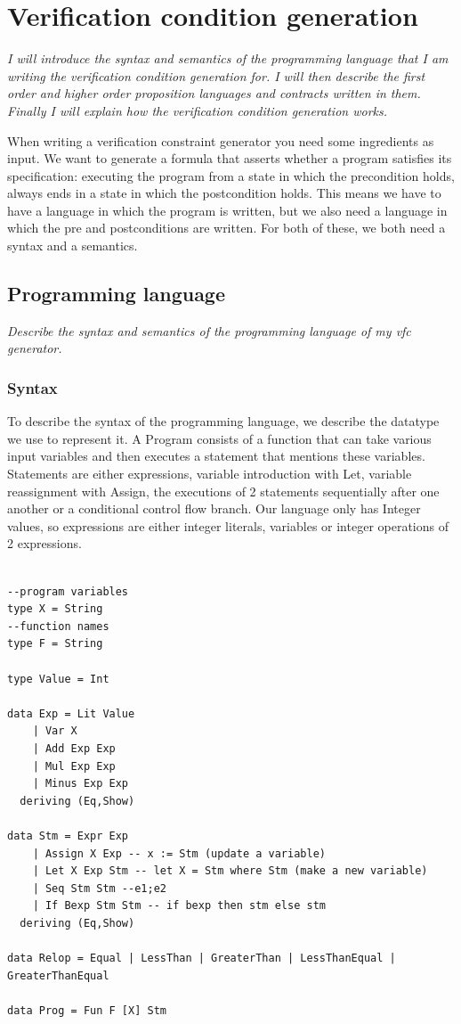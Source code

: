 \chapter{Verification condition generation}
\label{cha:2}
\textit{I will introduce the syntax and semantics of the programming language that I am writing the verification condition generation for. I will then describe the first order and higher order proposition languages and contracts written in them. Finally I will explain how the verification condition generation works.} 

When writing a verification constraint generator you need some ingredients as input. We want to generate a formula that asserts whether a program satisfies its specification: executing the program from a state in which the precondition holds, always ends in a state in which the postcondition holds. This means we have to have a language in which the program is written, but we also need a language in which the pre and postconditions are written. For both of these, we both need a syntax and a semantics.


\section{Programming language}
\textit{Describe the syntax and semantics of the programming language of my vfc generator.}



\subsection{Syntax}
To describe the syntax of the programming language, we describe the datatype we use to represent it. A Program consists of a function that can take various input variables and then executes a statement that mentions these variables. Statements are either expressions, variable introduction with Let, variable reassignment with Assign, the executions of 2 statements sequentially after one another or a conditional control flow branch. Our language only has Integer values, so expressions are either integer literals, variables or integer operations of 2 expressions.


\begin{verbatim}

--program variables
type X = String
--function names
type F = String

type Value = Int

data Exp = Lit Value
    | Var X
    | Add Exp Exp
    | Mul Exp Exp
    | Minus Exp Exp
  deriving (Eq,Show)
  
data Stm = Expr Exp
    | Assign X Exp -- x := Stm (update a variable)
    | Let X Exp Stm -- let X = Stm where Stm (make a new variable)
    | Seq Stm Stm --e1;e2
    | If Bexp Stm Stm -- if bexp then stm else stm
  deriving (Eq,Show)

data Relop = Equal | LessThan | GreaterThan | LessThanEqual | GreaterThanEqual

data Prog = Fun F [X] Stm
\end{verbatim}



